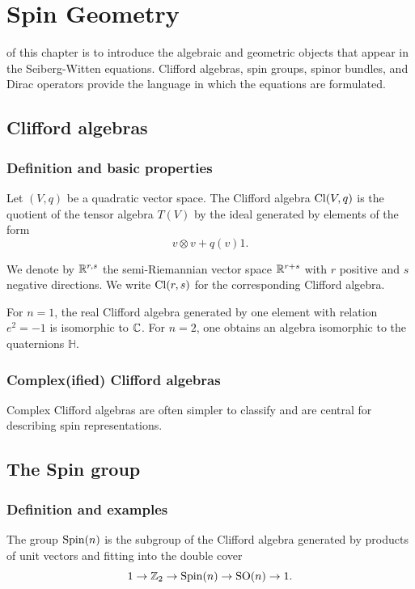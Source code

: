 \chapter{Spin Geometry}

 of this chapter is to introduce the algebraic and geometric objects that appear in the Seiberg-Witten equations. Clifford algebras, spin groups, spinor bundles, and Dirac operators provide the language in which the equations are formulated.

\section{Clifford algebras}
\subsection{Definition and basic properties}
\begin{definition}
Let $(V,q)$ be a quadratic vector space. The Clifford algebra $\operatorname{Cl}(V,q)$ is the quotient of the tensor algebra $T(V)$ by the ideal generated by elements of the form
\[
  v\otimes v + q(v)1.
\]
\end{definition}

\begin{notation}
We denote by $\mathbb{R}^{r,s}$ the semi-Riemannian vector space $\mathbb{R}^{r+s}$ with $r$ positive and $s$ negative directions. We write $\operatorname{Cl}(r,s)$ for the corresponding Clifford algebra.
\end{notation}

\begin{example}[$\Cl(1)$ and $\Cl(2)$]
For $n=1$, the real Clifford algebra generated by one element with relation $e^2=-1$ is isomorphic to $\mathbb{C}$. For $n=2$, one obtains an algebra isomorphic to the quaternions $\mathbb{H}$.
\end{example}

\subsection{Complex(ified) Clifford algebras}
Complex Clifford algebras are often simpler to classify and are central for describing spin representations.

\section{The Spin group}
\subsection{Definition and examples}
\begin{definition}
The group $\operatorname{Spin}(n)$ is the subgroup of the Clifford algebra generated by products of unit vectors and fitting into the double cover
\[
1\to \mathbb{Z}_2\to \operatorname{Spin}(n)\to \operatorname{SO}(n)\to 1.
\]
\end{definition}

